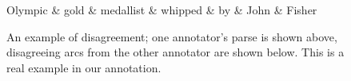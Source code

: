 \documentclass[11pt,a4paper]{article}
\newcommand{\yjcomment}[1]{\textcolor{orange}{[$_\mathrm{L}^\mathrm{Y}$#1]}}
\newcommand{\nascomment}[1]{\textcolor{blue}{[#1 ---\textsc{nas}]}}
\newcommand{\yicomment}[1]{\textcolor{gray}{[#1 ---\textsc{Yi}]}}
\begin{document}


\begin{figure}
\centering
\small
\begin{dependency}[edge slant=2, text only label, label style=above]
	\begin{deptext}
		Olympic \& gold \& medallist \& whipped \& by \& John \& Fisher \\
	\end{deptext}
\end{dependency}
\caption{An example of disagreement; one annotator's parse is shown above, disagreeing arcs from the other
  annotator are shown below. This is a real example in our annotation.}\label{fig:disagree}
\end{figure}
\end{document}

